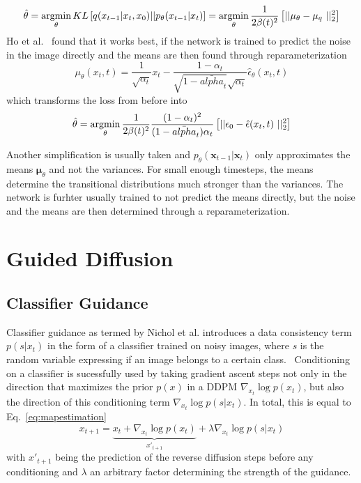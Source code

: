 \begin{equation}
    \hat{\theta} = \argmin_{\theta} KL \left[ q(x_{t-1}|x_{t},x_0) || p_{\theta}(x_{t-1}|x_{t}) \right] = \argmin_{\theta} \frac{1}{2\beta(t)^2} \left[ || \mu_{\theta} - \mu_{q} ||_2^2 \right]
\end{equation}
Ho et al.~\autocite{ho2020denoising} found that it works best, if the network is trained to predict the noise in the image directly and the means are then found through reparameterization
\begin{equation}
    \mu_{\theta}(x_t,t) = \frac{1}{\sqrt{\alpha_t}}x_t - \frac{1-\alpha_t}{\sqrt{1-\bar{alpha}_t}\sqrt{\alpha_t}}\hat{\epsilon}_{\theta}(x_t,t)
\end{equation}
which transforms the loss from before into
\begin{equation}
    \hat{\theta} = \argmin_{\theta}\frac{1}{2\beta(t)^2} \frac{(1-\alpha_t)^2}{(1-\bar{alpha}_t)\alpha_t} \left[ || \epsilon_0 - \hat{\epsilon}(x_t, t)  ||_2^2 \right]
\end{equation}


Another simplification is usually taken and $p_{\theta}(\bm{x}_{t-1} | \bm{x}_t)$ only approximates the means $\bm{\mu}_{\theta}$ and not the variances. For small enough timesteps, the means determine the transitional distributions much stronger than the variances. The network is furhter usually trained to not predict the means directly, but the noise and the means are then determined through a reparameterization.~\autocite{ho2020denoising,nichol2021improved}

\section{Guided Diffusion}
\subsection{Classifier Guidance}
Classifier guidance as termed by Nichol et al. introduces a data consistency term $p(s|x_t)$ in the form of a classifier trained on noisy images, where $s$ is the random variable expressing if an image belongs to a certain class.~\autocite{dhariwal2021diffusion,sohldickstein2015deep} Conditioning on a classifier is sucessfully used by taking gradient ascent steps not only in the direction that maximizes the prior $p(x)$ in a DDPM $\nabla_{x_t} \log p(x_t)$, but also the direction of this conditioning term $\nabla_{x_t} \log p(s|x_t)$. In total, this is equal to Eq.~\ref{eq:mapestimation}
\begin{equation}
    x_{t+1} = \underbrace{x_{t} + \nabla_{x_t} \log p(x_t)}_{x'_{t+1}} + \lambda \nabla_{x_t} \log p(s|x_t)
\end{equation}
with $x'_{t+1}$ being the prediction of the reverse diffusion steps before any conditioning and $\lambda$ an arbitrary factor determining the strength of the guidance.

